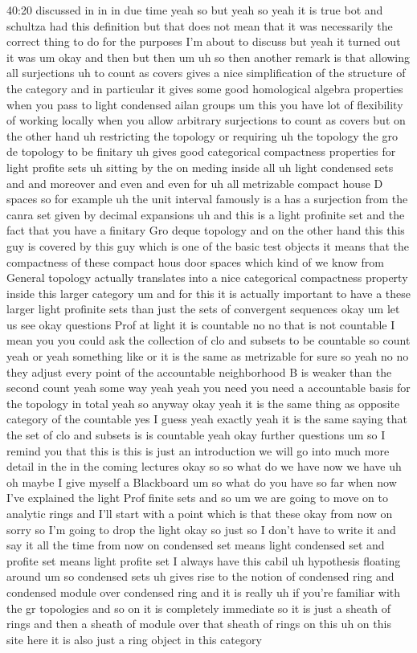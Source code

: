 \begin{unfinished}{40:20}
discussed in in in due time yeah so but yeah so yeah it is true bot and schultza had this definition but that does not mean that it was necessarily the correct thing to do for the purposes I'm about to discuss but yeah it turned out it was um okay and then but then um uh so then another remark is that allowing all surjections uh to count as covers gives a nice simplification of the structure of the category and in particular it gives some good homological algebra properties when you pass to light condensed ailan groups um this you have lot of flexibility of working locally when you allow arbitrary surjections to count as covers but on the other hand uh restricting the topology or requiring uh the topology the gro de topology to be finitary uh gives good categorical compactness properties for light profite sets uh sitting by the on meding inside all uh light condensed sets and and moreover and even and even for uh all metrizable compact house D spaces so for example uh the unit interval famously is a has a surjection from the canra set given by decimal expansions uh and this is a light profinite set and the fact that you have a finitary Gro deque topology and on the other hand this this guy is covered by this guy which is one of the basic test objects it means that the compactness of these compact hous door spaces which kind of we know from General topology actually translates into a nice categorical compactness property inside this larger category um and for this it is actually important to have a these larger light profinite sets than just the sets of convergent sequences okay um let us see okay questions Prof at light it is countable no no that is not countable I mean you you could ask the collection of clo and subsets to be countable so count yeah or yeah something like or it is the same as metrizable for sure so yeah no no they adjust every point of the accountable neighborhood B is weaker than the second count yeah some way yeah yeah you need you need a accountable basis for the topology in total yeah so anyway okay yeah it is the same thing as opposite category of the countable yes I guess yeah exactly yeah it is the same saying that the set of clo and subsets is is countable yeah okay further questions um so I remind you that this is this is just an introduction we will go into much more detail in the in the coming lectures okay so so what do we have now we have uh oh maybe I give myself a Blackboard um so what do you have so far when now I've explained the light Prof finite sets and so um we are going to move on to analytic rings and I'll start with a point which is that these okay from now on sorry so I'm going to drop the light okay so just so I don't have to write it and say it all the time from now on condensed set means light condensed set and profite set means light profite set I always have this cabil uh hypothesis floating around um so condensed sets uh gives rise to the notion of condensed ring and condensed module over condensed ring and it is really uh if you're familiar with the gr topologies and so on it is completely immediate so it is just a sheath of rings and then a sheath of module over that sheath of rings on this uh on this site here it is also just a ring object in this category


\end{unfinished}
